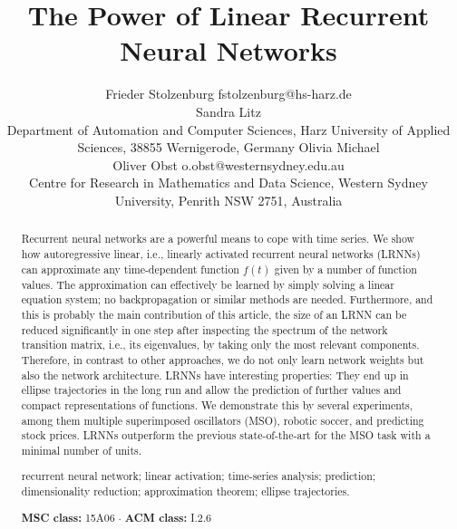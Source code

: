 \documentclass[twoside,11pt]{article}
\theoremstyle{definition}
\begin{document}
\title{The Power of Linear Recurrent Neural Networks}
\author{\name Frieder Stolzenburg \email fstolzenburg@hs-harz.de\\ %
	\name Sandra Litz\\ %
	\addr Department of Automation and Computer Sciences,
	Harz University of Applied Sciences,
	38855 Wernigerode, Germany
\AND	
	\name Olivia Michael\\ %
	\name Oliver Obst \email o.obst@westernsydney.edu.au\\ %
	\addr Centre for Research in Mathematics and Data Science,
	Western Sydney University,
	Penrith NSW 2751, Australia}
\editor{}
\maketitle

\begin{abstract}
Recurrent neural networks are a powerful means to cope with time series. We show
how autoregressive linear, i.e., linearly activated recurrent neural networks (LRNNs) can
approximate any time-dependent function $f(t)$ given by a number of function
values. The approximation can effectively be learned by simply solving a linear
equation system; no backpropagation or similar methods are needed. Furthermore,
and this is probably the main contribution of this article, the size of an
LRNN can be reduced significantly in one step after inspecting the spectrum
of the network transition matrix, i.e., its eigenvalues, by taking only the most
relevant components. Therefore, in contrast to other approaches, we do not only
learn network weights but also the network architecture. LRNNs have interesting
properties: They end up in ellipse trajectories in the long run and allow the
prediction of further values and compact representations of functions. We
demonstrate this by several experiments, among them multiple superimposed
oscillators (MSO), robotic soccer, and predicting stock prices. LRNNs outperform
the previous state-of-the-art for the MSO task with a minimal number of units.

\smallskip
\begin{keywords}
recurrent neural network; linear activation; time-series analysis; prediction;
dimensionality reduction; approximation theorem; ellipse trajectories.
\end{keywords}

\smallskip
\noindent\textbf{MSC class:} 15A06 \;$\cdot$\; \textbf{ACM class:} I.2.6%
\end{abstract}
\end{document}
